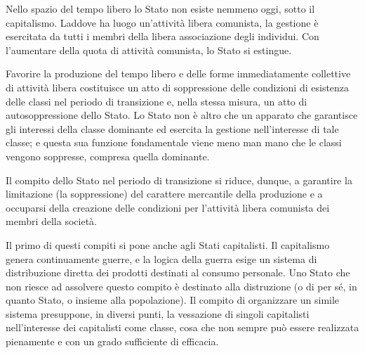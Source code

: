 \documentclass[12pt,a4paper,openany]{book}
\begin{document}
Nello spazio del tempo libero lo Stato non esiste nemmeno oggi, sotto il capitalismo. Laddove ha luogo un'attività libera comunista, la gestione è esercitata da tutti i membri della libera associazione degli individui. Con l'aumentare della quota di attività comunista, lo Stato si estingue.

Favorire la produzione del tempo libero e delle forme immediatamente collettive di attività libera costituisce un atto di soppressione delle condizioni di esistenza delle classi nel periodo di transizione e, nella stessa misura, un atto di autosoppressione dello Stato. Lo Stato non è altro che un apparato che garantisce gli interessi della classe dominante ed esercita la gestione nell'interesse di tale classe; e questa sua funzione fondamentale viene meno man mano che le classi vengono soppresse, compresa quella dominante.

Il compito dello Stato nel periodo di transizione si riduce, dunque, a garantire la limitazione (la soppressione) del carattere mercantile della produzione e a occuparsi della creazione delle condizioni per l'attività libera comunista dei membri della società.

Il primo di questi compiti si pone anche agli Stati capitalisti. Il capitalismo genera continuamente guerre, e la logica della guerra esige un sistema di distribuzione diretta dei prodotti destinati al consumo personale. Uno Stato che non riesce ad assolvere questo compito è destinato alla distruzione (o di per sé, in quanto Stato, o insieme alla popolazione). Il compito di organizzare un simile sistema presuppone, in diversi punti, la vessazione di singoli capitalisti nell'interesse dei capitalisti come classe, cosa che non sempre può essere realizzata pienamente e con un grado sufficiente di efficacia.
\end{document}

